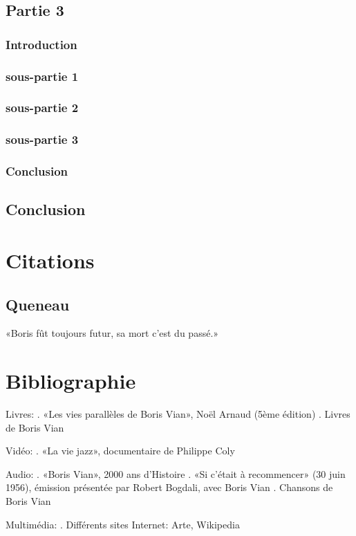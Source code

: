 \section{Partie 3}
\subsection{Introduction}
\subsection{sous-partie 1}
\subsection{sous-partie 2}
\subsection{sous-partie 3}
\subsection{Conclusion}
\section{Conclusion}
\chapter{Citations}
\section{Queneau}

«Boris fût toujours futur, sa mort c'est du passé.»



\chapter{Bibliographie}

Livres:
	. «Les vies parallèles de Boris Vian», Noël Arnaud (5ème édition)
	. Livres de Boris Vian

Vidéo:
	. «La vie jazz», documentaire de Philippe Coly

Audio:
	. «Boris Vian», 2000 ans d'Histoire
	. «Si c'était à recommencer» (30 juin 1956), émission présentée par Robert Bogdali, avec Boris Vian
	. Chansons de Boris Vian

Multimédia:
	. Différents sites Internet: Arte, Wikipedia



